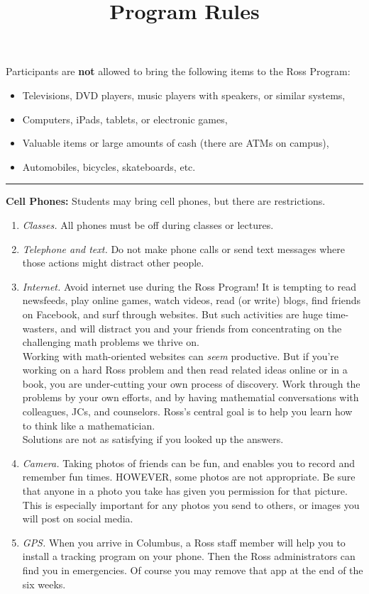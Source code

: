\documentclass{ross}
\title{Program Rules}
\begin{document}
\maketitle
Participants are {\bf not} allowed to bring the following items to the Ross
Program:
\begin{itemize}
\item Televisions, DVD players, music players with speakers, or similar systems,
\item Computers, iPads, tablets, or electronic games,
\item Valuable items or large amounts of cash (there are ATMs on campus),
\item Automobiles, bicycles, skateboards, etc.
\end{itemize}



\bigskip\hrule
\textbf{Cell Phones:} Students may bring cell phones, but there are restrictions. 
\begin{enumerate}[label=(\roman*),itemsep=0.5em,topsep= 0em]

\item {\it Classes.}  All phones must be off during classes or lectures. 

\item {\it Telephone and text.}  Do not make phone calls or send text messages 
where those actions might distract other people.

\item {\it Internet.} Avoid internet use during the Ross Program!  It is tempting to read newsfeeds, play online games, watch videos, read (or write) blogs, find friends on Facebook, and surf through websites.  But such activities are huge time-wasters, and will distract you and your friends from concentrating on the challenging math problems we thrive on.  \\[5pt]
Working with math-oriented websites can {\it seem} productive. But if you're working on a hard Ross problem and then read related ideas online or in a book, you are under-cutting your own process of discovery. Work through the problems by your own efforts, and by having mathematial conversations with colleagues, JCs, and counselors.  Ross's central goal  is to help you learn how to think like a mathematician.\\
\hspace*{1cm} Solutions are not as satisfying if you looked up the answers.

\item {\it Camera.}  Taking photos of friends can be fun, and enables you to record and remember fun times.  HOWEVER, some photos are not appropriate.  Be sure that anyone in a photo you take has given you permission for that picture.  This is especially important for any photos you send to others, or images you will post on social media.  

\item{\it  GPS.}  When you arrive in Columbus, a Ross staff member will help you to install a tracking program on your phone.  Then the Ross administrators can find you in emergencies.  Of course you may remove that app at the end of the six weeks.
\end{enumerate}
\end{document}
